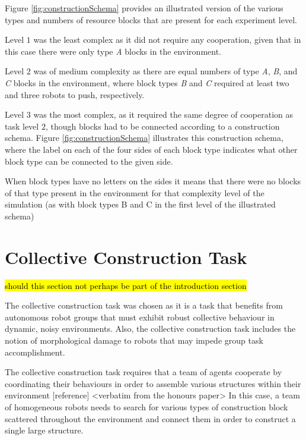 Figure \ref{fig:constructionSchema} provides an illustrated version of the various types and numbers of resource blocks that are present for each experiment level.

Level $1$ was the least complex as it did not require
any cooperation, given that in this case there were only type \textit{A}
blocks in the environment.

Level $2$ was of medium complexity as there are equal numbers of type \textit{A},
\textit{B}, and \textit{C} blocks in the environment, where block types \textit{B} and \textit{C} required
at least two and three robots to push, respectively.

Level $3$ was the most complex, as it required the same degree of cooperation as task level
$2$, though blocks had to be connected according to a construction schema.
Figure \ref{fig:constructionSchema}
illustrates this construction schema, where the label on each of the
four sides of each block type indicates what other block type can be connected to the given side.

When block types have no letters on the sides it means that there were no blocks of that type present in the environment for that complexity level of the simulation (as with block types B and C in the first level of the illustrated schema)

\section{Collective Construction Task}

\hl{should this section not perhaps be part of the introduction section}

The collective construction task was chosen as it is a task that benefits from autonomous robot groups that must exhibit robust collective behaviour in dynamic, noisy environments. Also, the collective construction task includes the notion of morphological damage to robots that may impede group task accomplishment. 

The collective construction task requires that a team of agents cooperate by coordinating their behaviours in order to assemble various structures within their environment [reference] <verbatim from the honours paper>
In this case, a team of homogeneous robots needs to search for various types of construction block scattered throughout the environment and connect them in order to construct a single large structure. 

